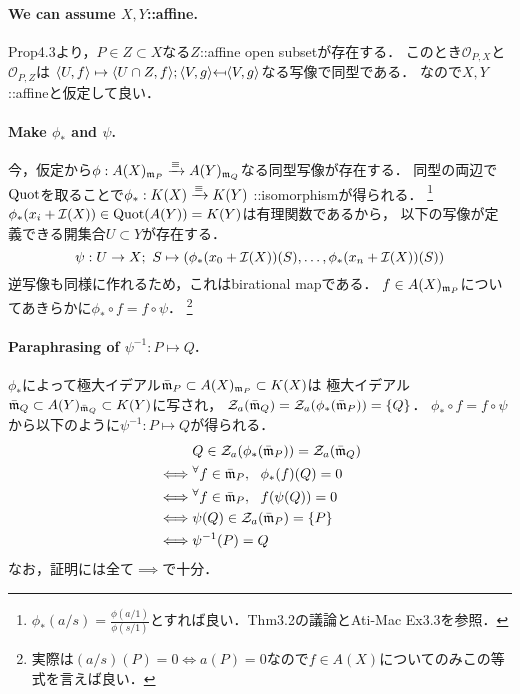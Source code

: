 \documentclass[a4paper]{jsarticle}
\begin{document}
    \paragraph{We can assume $X,Y$::affine.}
    Prop4.3より，$P \in Z \subset X$なる$Z$::affine open subsetが存在する．
    このとき$\mathcal{O}_{P,X}$と$\mathcal{O}_{P,Z}$は
    $\reg{U}{f} \mapsto \reg{U \cap Z}{f}; \reg{V}{g} \mapedfrom \reg{V}{g}$なる写像で同型である．
    なので$X,Y$::affineと仮定して良い．

    \paragraph{Make $\phi_{\ast}$ and $\psi$.}
    今，仮定から$\phi: A(X)_{\mathfrak{m}_P} \xrightarrow{\equiv} A(Y)_{\mathfrak{m}_Q}$なる同型写像が存在する．
    同型の両辺で$\operatorname{Quot}$を取ることで$\phi_{\ast}:K(X) \xrightarrow{\equiv} K(Y)$ ::isomorphismが得られる．
    \footnote{$\phi_{\ast}(a/s)=\frac{\phi(a/1)}{\phi(s/1)}$とすれば良い．Thm3.2の議論とAti-Mac Ex3.3を参照．}
    $\phi_{\ast}(x_i+\mathcal{I}(X)) \in \operatorname{Quot}(A(Y))=K(Y)$は有理関数であるから，
    以下の写像が定義できる開集合$U \subset Y$が存在する．
    \[ \psi: U \to X;~ S \mapsto (\phi_{\ast}(x_0+\mathcal{I}(X))(S), \dots, \phi_{\ast}(x_n+\mathcal{I}(X))(S)) \]
    逆写像も同様に作れるため，これはbirational mapである．
    $f \in A(X)_{\mathfrak{m}_P}$についてあきらかに$\phi_{\ast} \circ f=f \circ \psi$．
    \footnote{実際は$(a/s)(P)=0 \iff a(P)=0$なので$f \in A(X)$についてのみこの等式を言えば良い．}

    \paragraph{Paraphrasing of $\psi^{-1}: P \mapsto Q$.}
    $\phi_{\ast}$によって極大イデアル$\bar{\mathfrak{m}}_P \subset A(X)_{\mathfrak{m}_P} \subset K(X)$は
    極大イデアル$\bar{\mathfrak{m}}_Q \subset A(Y)_{\bar{\mathfrak{m}}_Q} \subset K(Y)$に写され，
    $\mathcal{Z}_a(\bar{\mathfrak{m}}_Q)=\mathcal{Z}_a(\phi_{\ast}(\bar{\mathfrak{m}}_P))=\{Q\}$．
    $\phi_{\ast} \circ f=f \circ \psi$から以下のように$\psi^{-1}: P \mapsto Q$が得られる．
    \begin{align*}
        {}&     Q \in \mathcal{Z}_a(\phi_{\ast}(\bar{\mathfrak{m}}_P))=\mathcal{Z}_a(\bar{\mathfrak{m}}_Q) \\
        \iff&   {}^{\forall} f \in \bar{\mathfrak{m}}_P,~~ \phi_{\ast}(f)(Q)=0 \\
        \iff&   {}^{\forall} f \in \bar{\mathfrak{m}}_P,~~ f(\psi(Q))=0 \\
        \iff&   \psi(Q) \in \mathcal{Z}_a(\bar{\mathfrak{m}}_P)=\{P\} \\
        \iff&   \psi^{-1}(P)=Q
    \end{align*}
    なお，証明には全て$\implies$で十分．
\end{document}
